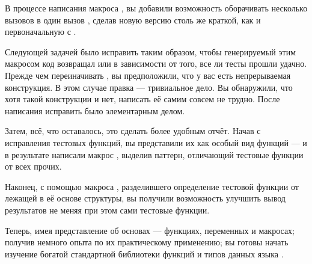 В процессе написания макроса , вы добавили возможность оборачивать несколько
вызовов  в один вызов , сделав новую версию 
столь же краткой, как и первоначальную с .

Следующей задачей было исправить  таким образом, чтобы генерируемый этим
макросом код возвращал  или  в зависимости от того, все ли тесты прошли
удачно. Прежде чем переиначивать , вы предположили, что у вас есть
непрерываемая  конструкция. В этом случае правка  --- тривиальное
дело. Вы обнаружили, что хотя такой конструкции и нет, написать её самим совсем не
трудно. После написания  исправить  было элементарным
делом.

Затем, всё, что оставалось, это сделать более удобным отчёт. Начав с исправления тестовых
функций, вы представили их как особый вид функций --- и в результате написали макрос
, выделив паттерн, отличающий тестовые функции от всех прочих.

Наконец, с помощью макроса , разделившего определение тестовой функции от
лежащей в её основе структуры, вы получили возможность улучшить вывод результатов не меняя
при этом сами тестовые функции.

Теперь, имея представление об основах --- функциях, переменных и макросах; получив немного
опыта по их практическому применению; вы готовы начать изучение богатой стандартной
библиотеки функций и типов данных языка .

